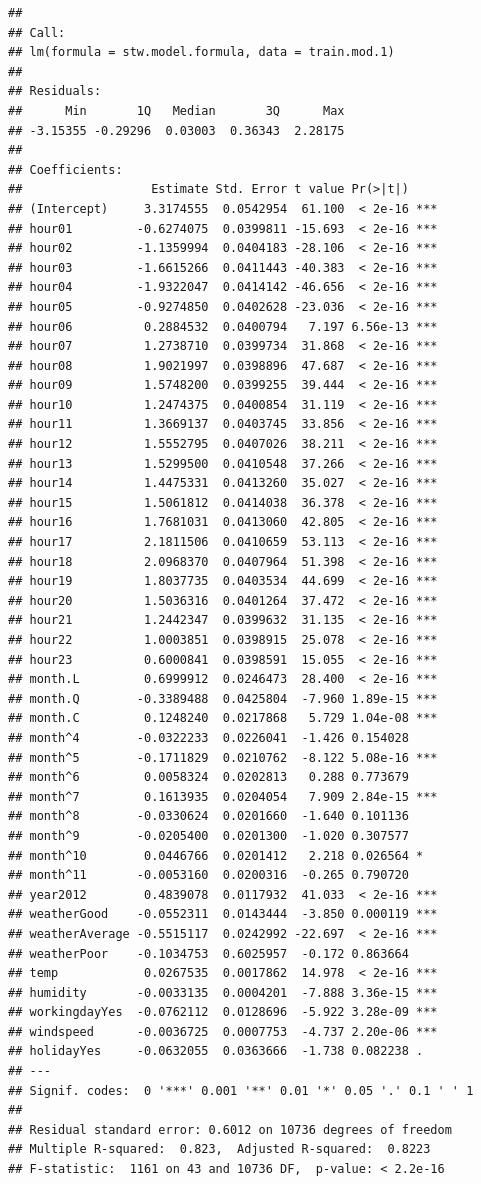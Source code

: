 \documentclass[american,]{article}
\begin{document}
\begin{verbatim}
## 
## Call:
## lm(formula = stw.model.formula, data = train.mod.1)
## 
## Residuals:
##      Min       1Q   Median       3Q      Max 
## -3.15355 -0.29296  0.03003  0.36343  2.28175 
## 
## Coefficients:
##                  Estimate Std. Error t value Pr(>|t|)    
## (Intercept)     3.3174555  0.0542954  61.100  < 2e-16 ***
## hour01         -0.6274075  0.0399811 -15.693  < 2e-16 ***
## hour02         -1.1359994  0.0404183 -28.106  < 2e-16 ***
## hour03         -1.6615266  0.0411443 -40.383  < 2e-16 ***
## hour04         -1.9322047  0.0414142 -46.656  < 2e-16 ***
## hour05         -0.9274850  0.0402628 -23.036  < 2e-16 ***
## hour06          0.2884532  0.0400794   7.197 6.56e-13 ***
## hour07          1.2738710  0.0399734  31.868  < 2e-16 ***
## hour08          1.9021997  0.0398896  47.687  < 2e-16 ***
## hour09          1.5748200  0.0399255  39.444  < 2e-16 ***
## hour10          1.2474375  0.0400854  31.119  < 2e-16 ***
## hour11          1.3669137  0.0403745  33.856  < 2e-16 ***
## hour12          1.5552795  0.0407026  38.211  < 2e-16 ***
## hour13          1.5299500  0.0410548  37.266  < 2e-16 ***
## hour14          1.4475331  0.0413260  35.027  < 2e-16 ***
## hour15          1.5061812  0.0414038  36.378  < 2e-16 ***
## hour16          1.7681031  0.0413060  42.805  < 2e-16 ***
## hour17          2.1811506  0.0410659  53.113  < 2e-16 ***
## hour18          2.0968370  0.0407964  51.398  < 2e-16 ***
## hour19          1.8037735  0.0403534  44.699  < 2e-16 ***
## hour20          1.5036316  0.0401264  37.472  < 2e-16 ***
## hour21          1.2442347  0.0399632  31.135  < 2e-16 ***
## hour22          1.0003851  0.0398915  25.078  < 2e-16 ***
## hour23          0.6000841  0.0398591  15.055  < 2e-16 ***
## month.L         0.6999912  0.0246473  28.400  < 2e-16 ***
## month.Q        -0.3389488  0.0425804  -7.960 1.89e-15 ***
## month.C         0.1248240  0.0217868   5.729 1.04e-08 ***
## month^4        -0.0322233  0.0226041  -1.426 0.154028    
## month^5        -0.1711829  0.0210762  -8.122 5.08e-16 ***
## month^6         0.0058324  0.0202813   0.288 0.773679    
## month^7         0.1613935  0.0204054   7.909 2.84e-15 ***
## month^8        -0.0330624  0.0201660  -1.640 0.101136    
## month^9        -0.0205400  0.0201300  -1.020 0.307577    
## month^10        0.0446766  0.0201412   2.218 0.026564 *  
## month^11       -0.0053160  0.0200316  -0.265 0.790720    
## year2012        0.4839078  0.0117932  41.033  < 2e-16 ***
## weatherGood    -0.0552311  0.0143444  -3.850 0.000119 ***
## weatherAverage -0.5515117  0.0242992 -22.697  < 2e-16 ***
## weatherPoor    -0.1034753  0.6025957  -0.172 0.863664    
## temp            0.0267535  0.0017862  14.978  < 2e-16 ***
## humidity       -0.0033135  0.0004201  -7.888 3.36e-15 ***
## workingdayYes  -0.0762112  0.0128696  -5.922 3.28e-09 ***
## windspeed      -0.0036725  0.0007753  -4.737 2.20e-06 ***
## holidayYes     -0.0632055  0.0363666  -1.738 0.082238 .  
## ---
## Signif. codes:  0 '***' 0.001 '**' 0.01 '*' 0.05 '.' 0.1 ' ' 1
## 
## Residual standard error: 0.6012 on 10736 degrees of freedom
## Multiple R-squared:  0.823,  Adjusted R-squared:  0.8223 
## F-statistic:  1161 on 43 and 10736 DF,  p-value: < 2.2e-16
\end{verbatim}
\end{document}
